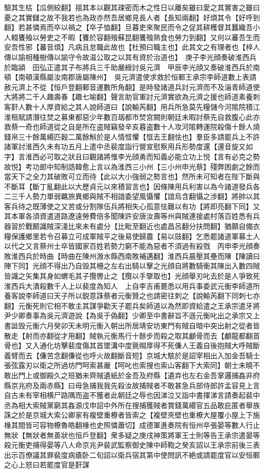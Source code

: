 驗其生枯【瓜側絞翻】揺其本以觀其疎密而木之性日以離矣雖曰愛之其實害之雖曰憂之其實讎之故不我若也為政亦然吾居鄉見長人者【長知兩翻】好煩其令【好呼到翻】若甚憐焉而卒以禍之【卒子恤翻】旦暮吏來聚民而令之促其耕穫督其蠶織吾小人輟饔飱以勞吏之不暇【饔於容翻飱蘇昆翻饔飱熟食也勞力到翻】又何以蕃吾生而安吾性邪【蕃音煩】凡病且怠職此故也【杜預曰職主也】此其文之有理者也【梓人傳以諭相種樹傳以諭守令故温公取之以其有資於治道也】　庚子李光顔奏破淮西兵於臨潁　田弘正遣其子布將兵三千助嚴綬討吳元濟　甲辰李光顔又奏破淮西兵於南頓【南頓漢縣屬汝南郡唐屬陳州】　吳元濟遣使求救於恒鄆王承宗李師道數上表請赦元濟上不從【恒戶登翻鄆音運數所角翻】是時發諸道兵討元濟而不及淄青師道使大將將二千人趣壽春【趣七喻翻】聲言助官軍討元濟實欲為元濟之援也師道素養刺客姧人數十人厚資給之其人說師道曰【說輸芮翻】用兵所急莫先糧儲今河隂院積江淮租賦請潛往焚之募東都惡少年數百刼都市焚宫闕則朝廷未暇討蔡先自救腹心此亦救蔡一奇也師道從之自是所在盗賊竊發辛亥暮盗數十人攻河隂轉運院殺傷十餘人燒錢帛三十餘萬緡匹穀二萬餘斛於是人情恇懼【恇去王翻怯也】羣臣多請罷兵上不許　諸軍討淮西久未有功五月上遣中丞裴度詣行營宣慰察用兵形勢度還【還音旋又如字】言淮西必可取之狀且曰觀諸將惟李光顔勇而知義必能立功上悦【言有必克之勢故悦】考功郎中知制誥韓愈上言以為淮西三小州【三小州申光蔡】殘弊困劇之餘而當天下之全力其破敗可立而待【此以大小強弱之勢言也】然所未可知者在陛下斷與不斷耳【斷丁亂翻此以大歷貞元以來積習言也】因條陳用兵利害以為今諸道發兵各二三千人勢力單弱羈旅異鄉與賊不相諳委望風懾懼【諳烏含翻懾之涉翻】將帥以其客兵待之既薄使之又苦或分割隊伍兵將相失心孤意怯難以有功【將即亮翻下同】又其本軍各須資遣道路遼遠勞費倍多聞陳許安唐汝壽等州與賊連接處村落百姓悉有兵器習於戰鬭識賊深淺比來未有處分【比毗至翻近也處昌呂翻分扶問翻】猶願自備衣糧保護鄉里若令召募立可成軍賊平之後易使歸農【易以豉翻】乞悉罷諸道軍募土人以代之又言蔡州士卒皆國家百姓若勢力窮不能為惡者不須過有殺戮　丙申李光顔奏敗淮西兵於時曲【時曲在陳州溵水縣西南敗補邁翻】淮西兵晨壓其壘而陳【陳讀曰陣下同】光顔不得出乃自毁其柵之左右出騎以擊之光顔自將數騎衝其陳出入數四賊皆識之矢集其身如蝟毛其子攬轡止之【攬以手擥取也】光顔舉刃叱去於是人爭致死淮西兵大潰殺數千人上以裴度為知人　上自李吉甫薨悉以用兵事委武元衡李師道所養客說李師道曰天子所以鋭意誅蔡者元衡贊之也請密往刺之【說輸芮翻下同刺七亦翻】元衡死則它相不敢主其謀爭勸天子罷兵矣師道以為然即資給遣之王承宗遣牙將尹少卿奏事為吳元濟遊說【為吳于偽翻】少卿至中書辭旨不遜元衡叱出之承宗又上書詆毁元衡六月癸卯天未明元衡入朝出所居靖安坊東門有賊自暗中突出射之從者皆散走【射而亦翻從才用翻】賊執元衡馬行十餘步而殺之取其顱骨而去【顱龍都翻首骨也】又入通化坊擊裴度傷其首墜溝中度氈㡌厚得不死傔人王義自後抱賊大呼賊斷義臂而去【傔苦念翻傔從也呼火故翻斷音短】京城大駭於是詔宰相出入加金吾騎士張弦露刃以衛之所過坊門呵索甚嚴【呵叱也索搜也索山客翻下大索同】朝士未曉不敢出門上或御殿久之班猶未齊賊遺紙於金吾及府縣【遺弃也左右金吾掌邏捕姦非府縣京兆府及兩赤縣】曰毋急捕我我先殺汝故捕賊者不敢甚急兵部侍郎許孟容見上言自古未有宰相横尸路隅而盗不獲者此朝廷之辱也因涕泣又詣中書揮涕言請奏起裴中丞為相大索賊黨窮其姦源戊申詔中外所在搜捕獲賊者賞錢萬緡官五品敢庇匿者舉族誅之於是京城大索公卿家有複壁重橑者皆索之【複壁夾壁也重橑大屋覆小屋上下施椽其間皆可容物橑魯皓翻椽也史照憐蕭切】成德軍進奏院有恒州卒張晏等數人行止無狀【無狀者無善狀也恒戶登翻】衆多疑之庚戌神策將軍王士則等告王承宗遣晏等殺元衡吏捕得晏等八人命京兆尹裴武監察御史陳中師鞫之癸亥詔以王承宗前後三表出示百僚議其罪裴度病瘡卧二旬詔以衛兵宿其第中使問訊不絶或請罷度官以安恒鄆之心上怒曰若罷度官是姧謀